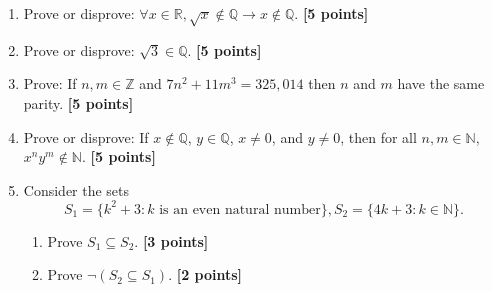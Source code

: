 \documentclass{article}
\begin{document}
\begin{enumerate}
 \item Prove or disprove:  $\forall x \in \mathbb{R}, \sqrt{x} \notin \mathbb{Q} \rightarrow x \notin \mathbb{Q} $.   \textbf{[5 points]}

\item Prove or disprove: $ \sqrt{3} \in \mathbb{Q}$.  \textbf{[5 points]} %

\item Prove:  If $n, m \in \mathbb{Z}$ and $7 n^2 + 11 m^3 = 325,014$ then $n$ and $m$ have the same parity.  \textbf{[5 points]}

\item Prove or disprove: If $x \notin \mathbb{Q}$, $y \in \mathbb{Q}$, $x \neq 0$, and $y \neq 0$, then for all $n, m \in \mathbb{N}$,  $x^ny^m
\notin \mathbb{N}$.  \textbf{[5 points]}

\item Consider the sets 
\[ S_1 = \{k^2+3: k \mbox{ is an even natural number} \},   S_2 = \{4k+3: k \in \mathbb{N} \}.    \]
\begin{enumerate}
	\item Prove $S_1 \subseteq S_2$. \textbf{[3 points]}
	\item Prove $\neg (S_2 \subseteq S_1)$. \textbf{[2 points]}
\end{enumerate}
\end{enumerate}
\end{document}
